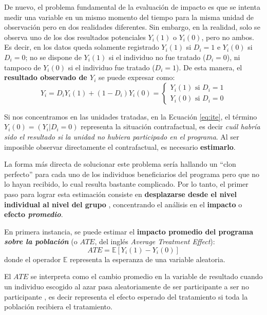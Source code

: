 \documentclass[../../main.tex]{subfiles}
\begin{document}
De nuevo, el problema fundamental de la evaluación de impacto es que se intenta medir una
variable en un mismo momento del tiempo para la misma unidad de observación pero en dos
realidades diferentes. Sin embargo, en la realidad, solo se observa uno de los dos resultados
potenciales \(Y_i(1)\) o \(Y_i(0)\), pero no ambos. Es decir, en los datos queda solamente
registrado \(Y_i(1)\) si \(D_i=1\) e \(Y_i(0)\) si \(D_i=0\); no se dispone de \(Y_i(1)\)
si el individuo no fue tratado (\(D_i=0\)), ni tampoco de \(Y_i(0)\) si el individuo fue
tratado (\(D_i=1\)). De esta manera, el \textbf{resultado observado de \(Y_i\)} se puede
expresar como:
\begin{equation}
    Y_i = D_i Y_i(1) + (1-D_i)Y_i(0) =
    \begin{cases}
        Y_i(1) \text{ si } D_i=1 \\
        Y_i(0) \text{ si } D_i=0
    \end{cases}
    \label{eq:observed-result}
\end{equation}

Si nos concentramos en las unidades tratadas, en la Ecuación \ref{eq:ite}, el término
\(Y_i(0) = (Y_i|D_i=0)\) representa la situación contrafactual, es decir \textit{cuál
habría sido el resultado si la unidad no hubiera participado en el programa}. Al ser
imposible observar directamente el contrafactual, es necesario \textbf{estimarlo}.

La forma más directa de solucionar este problema sería hallando un ``clon perfecto'' para
cada uno de los individuos beneficiarios del programa pero que no lo hayan recibido, lo
cual resulta bastante complicado. Por lo tanto, el primer paso para lograr esta estimación
consiste en \textbf{desplazarse desde el nivel individual al nivel del grupo}
\cite{gertler-2016}, concentrando el análisis en el \textbf{impacto} o \textbf{efecto
\textit{promedio}}.

En primera instancia, se puede estimar el \textbf{impacto promedio del programa
\textit{sobre la población}} (o \(ATE\), del inglés \textit{Average Treatment Effect}):
\begin{equation}
    ATE = \mathbb{E}\left[Y_i(1)-Y_i(0)\right]
\end{equation}
donde el operador \(\mathbb{E}\) representa la esperanza de una variable aleatoria.

El \(ATE\) se interpreta como el cambio promedio en la variable de resultado cuando un
individuo escogido al azar pasa aleatoriamente de ser participante a ser no participante
\cite{bernal}, es decir representa el efecto esperado del tratamiento si toda la población
recibiera el tratamiento.
\end{document}
